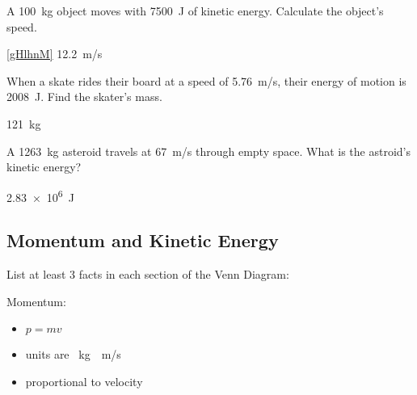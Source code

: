 \documentclass[answers]{exam}
\begin{document}
\begin{questions}
\question \label{gHlhnM}
A \SI{100}{kg} object moves with \SI{7500}{J} of kinetic energy. Calculate the object's speed.

\begin{solution}
\ref{gHlhnM} \SI{12.2}{m/s}
\end{solution}


\question \label{WH6xot}
When a skate rides their board at a speed of \SI{5.76}{m/s}, their energy of motion is \SI{2008}{J}. Find the skater's mass.

\begin{solution}
\SI{121}{kg}
\end{solution}

\question \label{X7RPxf}
A \SI{1263}{kg} asteroid travels at \SI{67}{m/s} through empty space. What is the astroid's kinetic energy?

\begin{solution}
\SI{2.83e6}{J}
\end{solution}

\clearpage
\begin{EnvUplevel}
    \subsection{Momentum and Kinetic Energy}
\end{EnvUplevel}

\question %
List at least 3 facts in each section of the Venn Diagram:

\begin{center}
\end{center}

\begin{solution}
\phantom{.}

Momentum:

\begin{itemize}[itemsep=0pt,topsep=0pt]
    \item $p=mv$
    \item units are \SI{}{kg\cdot m/s}
    \item proportional to velocity
\end{itemize}


\end{solution}
\end{questions}
\end{document}
